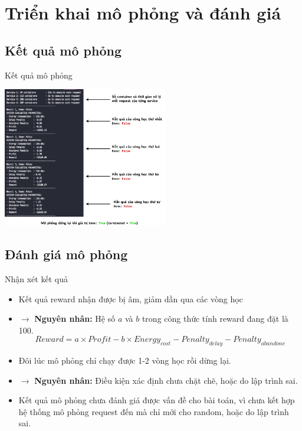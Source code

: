 \documentclass[10pt,aspectratio=169]{beamer}
\begin{document}
\section{Triển khai mô phỏng và đánh giá}

\subsection{Kết quả mô phỏng}

\begin{frame}{Kết quả mô phỏng}
\begin{center}
\includegraphics[width=0.54\textwidth]{source/5.png}\\
\end{center}
\end{frame}

\subsection{Đánh giá mô phỏng}

\begin{frame}{Nhận xét kết quả}{\subsecname}
\begin{itemize}
\setlength\itemsep{8pt}
\item Kết quả reward nhận được bị âm, giảm dần qua các vòng học
\item[] $ \longrightarrow $ \textbf{Nguyên nhân:} Hệ số $ a $ và $ b $ trong công thức tính reward đang đặt là 100.
\begin{equation*}
Reward = a \times Profit - b \times Energy_{cost} - Penalty_{delay} - Penalty_{abandone}
\end{equation*}
\item Đôi lúc mô phỏng chỉ chạy được 1-2 vòng học rồi dừng lại.
\item[] $ \longrightarrow $ \textbf{Nguyên nhân:} Điều kiện xác định  chưa chặt chẽ, hoặc do lập trình sai.
\item Kết quả mô phỏng chưa đánh giá được vấn đề cho bài toán, vì chưa kết hợp hệ thống mô phỏng request đến mà chỉ mới cho random, hoặc do lập trình sai.
\end{itemize}
\end{frame}
\end{document}

